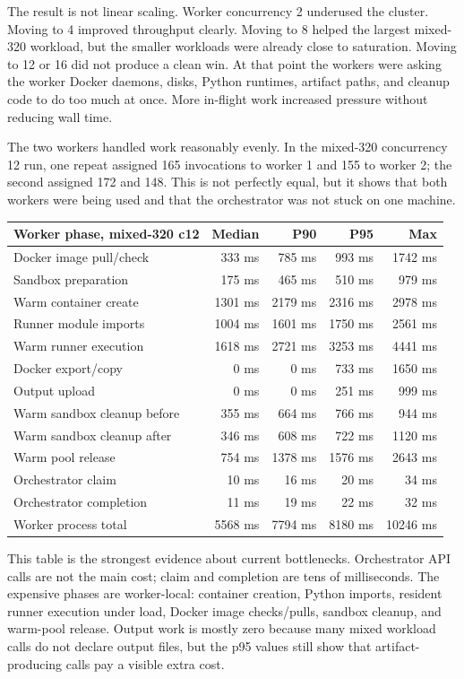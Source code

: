 \documentclass[12pt,a4paper]{report}
\begin{document}
The result is not linear scaling. Worker concurrency 2 underused the cluster.
Moving to 4 improved throughput clearly. Moving to 8 helped the largest
mixed-320 workload, but the smaller workloads were already close to saturation.
Moving to 12 or 16 did not produce a clean win. At that point the workers were
asking the worker Docker daemons, disks, Python runtimes, artifact paths, and
cleanup code to do too much at once. More in-flight work increased pressure
without reducing wall time.

The two workers handled work reasonably evenly. In the mixed-320 concurrency
12 run, one repeat assigned 165 invocations to worker 1 and 155 to worker 2;
the second assigned 172 and 148. This is not perfectly equal, but it shows that
both workers were being used and that the orchestrator was not stuck on one
machine.

\begin{longtable}{p{}rrrr}
\toprule
\textbf{Worker phase, mixed-320 c12} & \textbf{Median} & \textbf{P90} & \textbf{P95} & \textbf{Max} \\
\midrule
Docker image pull/check & 333 ms & 785 ms & 993 ms & 1742 ms \\
Sandbox preparation & 175 ms & 465 ms & 510 ms & 979 ms \\
Warm container create & 1301 ms & 2179 ms & 2316 ms & 2978 ms \\
Runner module imports & 1004 ms & 1601 ms & 1750 ms & 2561 ms \\
Warm runner execution & 1618 ms & 2721 ms & 3253 ms & 4441 ms \\
Docker export/copy & 0 ms & 0 ms & 733 ms & 1650 ms \\
Output upload & 0 ms & 0 ms & 251 ms & 999 ms \\
Warm sandbox cleanup before & 355 ms & 664 ms & 766 ms & 944 ms \\
Warm sandbox cleanup after & 346 ms & 608 ms & 722 ms & 1120 ms \\
Warm pool release & 754 ms & 1378 ms & 1576 ms & 2643 ms \\
Orchestrator claim & 10 ms & 16 ms & 20 ms & 34 ms \\
Orchestrator completion & 11 ms & 19 ms & 22 ms & 32 ms \\
Worker process total & 5568 ms & 7794 ms & 8180 ms & 10246 ms \\
\bottomrule
\end{longtable}

This table is the strongest evidence about current bottlenecks. Orchestrator
API calls are not the main cost; claim and completion are tens of milliseconds.
The expensive phases are worker-local: container creation, Python imports,
resident runner execution under load, Docker image checks/pulls, sandbox
cleanup, and warm-pool release. Output work is mostly zero because many mixed
workload calls do not declare output files, but the p95 values still show that
artifact-producing calls pay a visible extra cost.
\end{document}
